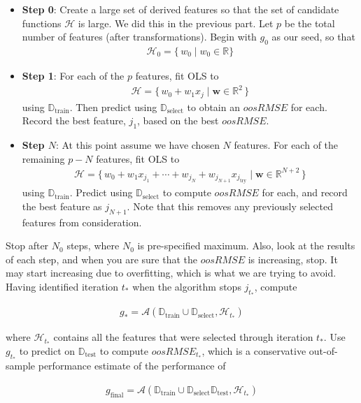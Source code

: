 \documentclass[12pt]{article}
\newcommand{\train}{\text{train}}
\newcommand{\select}{\text{select}}
\newcommand{\test}{\text{test}}
\newcommand{\Dtrain}{\mathbb{D}_\train}
\newcommand{\Dselect}{\mathbb{D}_\select}
\newcommand{\Dtest}{\mathbb{D}_\test}
\begin{document}
\begin{enumerate}
\begin{itemize}
	\item \textbf{Step 0}: Create a large set of derived features so that the
	set of candidate functions $\mathcal{H}$ is large. We did this in the previous part.
	Let $p$ be the total number of features (after transformations).
	Begin with $g_0$ as our seed, so that
	\begin{align*}
		\mathcal{H}_0 = \{\, w_0 \mid w_0\in \mathbb{R} \}
	\end{align*}
	\item \textbf{Step 1}: For each of the $p$ features, fit OLS to
	\begin{align*}
		\mathcal{H} = \{\, w_0 + w_1 x_{j} \mid  \bm{w}\in \mathbb{R}^2 \,\}
	\end{align*}
	using $\Dtrain$. Then predict using $\Dselect$ to obtain an $oosRMSE$ for each.
	Record the best feature, $j_1$, based on the best $oosRMSE$.
	\item \textbf{Step $N$}: At this point assume we have chosen $N$
	features. For each of the remaining $p-N$ features, fit OLS to
	\begin{align*}
		\mathcal{H} = \{\,
		w_0 + w_1 x_{j_{1}}+\cdots + w_{j_{N}} + w_{j_{N+1}}x_{j_{\text{try}}} \mid \bm{w}\in \mathbb{R}^{N+2}
		\,\}
	\end{align*}
	using $\Dtrain$. Predict using $\Dselect$ to compute $oosRMSE$ for each,
	and record the best feature as $j_{N+1}$. Note that this removes any previously
	selected features from consideration.
\end{itemize}

Stop after $N_0$ steps, where $N_0$ is pre-specified maximum. Also, look at
the results of each step, and when you are sure that the $oosRMSE$ is increasing,
stop. It may start increasing due to overfitting, which is what we are trying
to avoid. Having identified iteration $t_*$ when the algorithm stops $j_{t_{*}}$,
compute

\begin{align*}
	g_* = \mathcal{A}(\Dtrain \cup \Dselect, \mathcal{H}_{t_*})
\end{align*}

where $\mathcal{H}_{t_*}$ contains all the features that were selected through
iteration $t_{*}$. Use $g_{t_*}$ to predict on $\Dtest$ to compute $oosRMSE_{t_*}$,
which is a conservative out-of-sample performance estimate of the performance of

\begin{align*}
	g_{\text{final}} = \mathcal{A}(\Dtrain \cup \Dselect \Dtest, \mathcal{H}_{t_*})
\end{align*}

\end{enumerate}
\end{document}
